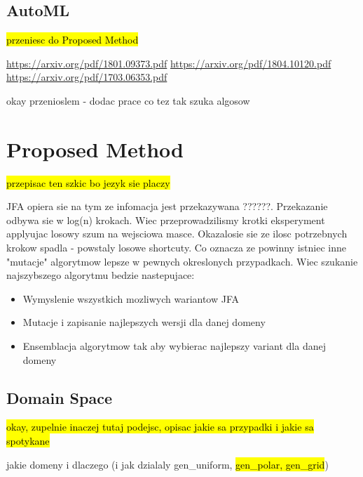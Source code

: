 \documentclass[format=acmsmall,screen,review,authordraft,nonacm]{acmart}
\begin{document}
\subsection{AutoML} %

\hl{przeniesc do Proposed Method}

\url{https://arxiv.org/pdf/1801.09373.pdf}
\url{https://arxiv.org/pdf/1804.10120.pdf}
\url{https://arxiv.org/pdf/1703.06353.pdf}

okay przenioslem - dodac prace co tez tak szuka algosow

\section{Proposed Method} %

\hl{przepisac ten szkic bo jezyk sie placzy}

JFA opiera sie na tym ze infomacja jest przekazywana ??????.  Przekazanie odbywa
sie w log(n) krokach. Wiec przeprowadzilismy krotki eksperyment applyujac losowy
szum na wejsciowa masce. Okazalosie sie ze ilosc potrzebnych krokow spadla -
powstaly losowe shortcuty.  Co oznacza ze powinny istniec inne "mutacje"
algorytmow lepsze w pewnych okreslonych przypadkach.  Wiec szukanie najszybszego
algorytmu bedzie nastepujace:

\begin{itemize}
\item Wymyslenie wszystkich mozliwych wariantow JFA
\item Mutacje i zapisanie najlepszych wersji dla danej domeny
\item Ensemblacja algorytmow tak aby wybierac najlepszy variant dla danej domeny
\end{itemize}

\subsection{Domain Space} %

\hl{okay, zupelnie inaczej tutaj podejsc, opisac jakie sa przypadki i jakie sa
spotykane}

jakie domeny i dlaczego (i jak dzialaly gen\_uniform, \hl{gen\_polar, gen\_grid})
\end{document}
